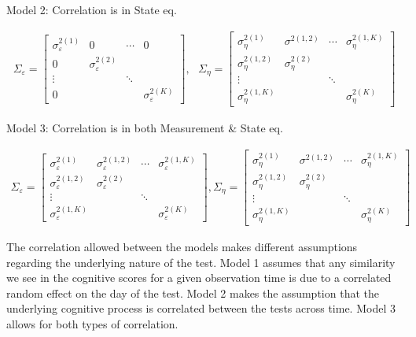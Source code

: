 \documentclass[
]{article}
\begin{document}
Model 2: Correlation is in State eq.

\begin{equation*}
\begin{aligned}
\Sigma_\varepsilon = 
\begin{bmatrix}
\sigma^{2(1)}_\varepsilon & 0 & \cdots & 0\\
0 & \sigma^{2(2)}_\varepsilon\\
\vdots & & \ddots\\
0 & & &\sigma^{2(K)}_\varepsilon
\end{bmatrix},
\ \ \ 
\Sigma_\eta =
\begin{bmatrix}
\sigma^{2(1)}_\eta & \sigma^{2(1,2)} & \cdots & \sigma^{2(1, K)}_\eta\\
\sigma^{2(1,2)}_\eta & \sigma^{2(2)}_\eta\\
\vdots & & \ddots\\
\sigma^{2(1, K)}_\eta & & &\sigma^{2(K)}_\eta
\end{bmatrix}
\end{aligned}
\end{equation*}

Model 3: Correlation is in both Measurement \& State eq.

\begin{equation*}
\begin{aligned}
\Sigma_\varepsilon = 
\begin{bmatrix}
\sigma^{2(1)}_\varepsilon & \sigma^{2(1,2)}_\varepsilon & \cdots & \sigma^{2(1, K)}_\varepsilon\\
\sigma^{2(1,2)}_\varepsilon & \sigma^{2(2)}_\varepsilon\\
\vdots & & \ddots\\
\sigma^{2(1, K)}_\varepsilon & & &\sigma^{2(K)}_\varepsilon
\end{bmatrix},
\Sigma_\eta =
\begin{bmatrix}
\sigma^{2(1)}_\eta & \sigma^{2(1,2)} & \cdots & \sigma^{2(1, K)}_\eta\\
\sigma^{2(1,2)}_\eta & \sigma^{2(2)}_\eta\\
\vdots & & \ddots\\
\sigma^{2(1, K)}_\eta & & &\sigma^{2(K)}_\eta
\end{bmatrix}
\end{aligned}
\end{equation*}

The correlation allowed between the models makes different assumptions regarding the underlying nature of the test. Model 1 assumes that any similarity we see in the cognitive scores for a given observation time is due to a correlated random effect on the day of the test. Model 2 makes the assumption that the underlying cognitive process is correlated between the tests across time. Model 3 allows for both types of correlation.
\end{document}
